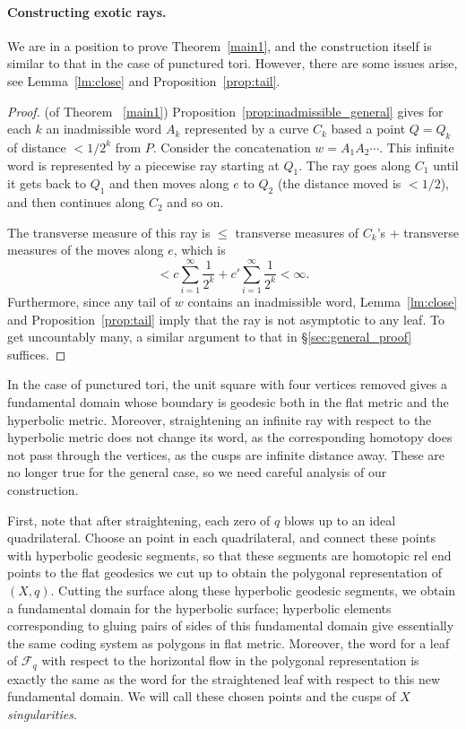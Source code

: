 \documentclass[11pt]{article} %
\theoremstyle{plain}
\theoremstyle{definition}
\numberwithin{equation}{section}
\begin{document}
\paragraph{Constructing exotic rays.}
We are in a position to prove Theorem~\ref{main1}, and the construction itself is similar to that in the case of punctured tori. However, there are some issues arise, see Lemma~\ref{lm:close} and Proposition~\ref{prop:tail}.

\begin{proof}(of Theorem ~\ref{main1}) Proposition~\ref{prop:inadmissible_general} gives for each $k$ an inadmissible word $A_k$ represented by a curve $C_k$ based a point $Q=Q_k$ of distance $<1/2^k$ from $P$. Consider the concatenation $w=A_1A_2\cdots$. This infinite word is represented by a piecewise ray starting at $Q_1$. The ray goes along $C_1$ until it gets back to $Q_1$ and then moves along $e$ to $Q_2$ (the distance moved is $<1/2$), and then continues along $C_2$ and so on.

The transverse measure of this ray is $\leq$ transverse measures of $C_k$'s + transverse measures of the moves along $e$, which is
$$< c\sum _{i=1}^{\infty} \frac{1}{2^k}+ c'\sum_{i=1}^{\infty} \frac{1}{2^k}<\infty.$$
Furthermore, since any tail of $w$ contains an inadmissible word, Lemma~\ref{lm:close} and Proposition~\ref{prop:tail} imply that the ray is not asymptotic to any leaf. To get uncountably many, a similar argument to that in \S\ref{sec:general_proof} suffices.
\end{proof}
In the case of punctured tori, the unit square with four vertices removed gives a fundamental domain whose boundary is geodesic both in the flat metric and the hyperbolic metric. Moreover, straightening an infinite ray with respect to the hyperbolic metric does not change its word, as the corresponding homotopy does not pass through the vertices, as the cusps are infinite distance away. These are no longer true for the general case, so we need careful analysis of our construction.

First, note that after straightening, each zero of $q$ blows up to an ideal quadrilateral. Choose an point in each quadrilateral, and connect these points with hyperbolic geodesic segments, so that these segments are homotopic rel end points to the flat geodesics we cut up to obtain the polygonal representation of $(X,q)$. Cutting the surface along these hyperbolic geodesic segments, we obtain a fundamental domain for the hyperbolic surface; hyperbolic elements corresponding to gluing pairs of sides of this fundamental domain give essentially the same coding system as polygons in flat metric. Moreover, the word for a leaf of $\mathcal{F}_q$ with respect to the horizontal flow in the polygonal representation is exactly the same as the word for the straightened leaf with respect to this new fundamental domain. We will call these chosen points and the cusps of $X$ \emph{singularities}.
\end{document}
